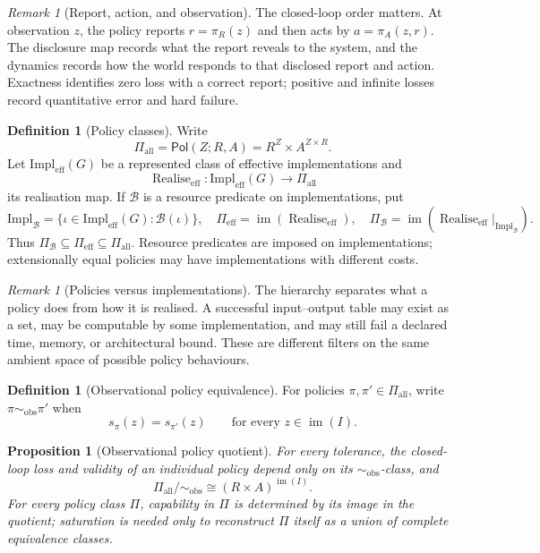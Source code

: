 \documentclass[11pt]{article}
\theoremstyle{plain}
\newtheorem{proposition}[theorem]{Proposition}
\theoremstyle{definition}
\newtheorem{definition}[theorem]{Definition}
\theoremstyle{remark}
\newtheorem{remark}[theorem]{Remark}
\newcommand{\im}{\operatorname{im}}
\newcommand{\Pol}{\mathsf{Pol}}
\newcommand{\realise}{\operatorname{Realise}}
\begin{document}
\begin{remark}[Report, action, and observation]
The closed-loop order matters. At observation $z$, the policy reports
$r=\pi_R(z)$ and then acts by $a=\pi_A(z,r)$. The disclosure map records what the
report reveals to the system, and the dynamics records how the world responds to
that disclosed report and action. Exactness identifies zero loss with a correct
report; positive and infinite losses record quantitative error and hard failure.
\end{remark}

\begin{definition}[Policy classes]\label{def:realise}
Write
\[
\Pi_{\mathrm{all}}=\Pol(Z;R,A)=R^Z\times A^{Z\times R}.
\]
Let $\mathrm{Impl}_{\mathrm{eff}}(G)$ be a represented class of effective
implementations and
\[
\realise_{\mathrm{eff}}:\mathrm{Impl}_{\mathrm{eff}}(G)
\to\Pi_{\mathrm{all}}
\]
its realisation map. If $\mathcal B$ is a resource predicate on implementations,
put
\[
\mathrm{Impl}_{\mathcal B}
=\{\iota\in\mathrm{Impl}_{\mathrm{eff}}(G):\mathcal B(\iota)\},\quad
\Pi_{\mathrm{eff}}=\im(\realise_{\mathrm{eff}}),\quad
\Pi_{\mathcal B}=\im(\realise_{\mathrm{eff}}|_{\mathrm{Impl}_{\mathcal B}}).
\]
Thus $\Pi_{\mathcal B}\subseteq\Pi_{\mathrm{eff}}\subseteq\Pi_{\mathrm{all}}$.
Resource predicates are imposed on implementations; extensionally equal policies
may have implementations with different costs.
\end{definition}

\begin{remark}[Policies versus implementations]
The hierarchy separates what a policy does from how it is realised. A successful
input--output table may exist as a set, may be computable by some implementation,
and may still fail a declared time, memory, or architectural bound. These are
different filters on the same ambient space of possible policy behaviours.
\end{remark}



\begin{definition}[Observational policy equivalence]\label{def:gauge}
For policies $\pi,\pi'\in\Pi_{\mathrm{all}}$, write
$\pi\sim_{\mathrm{obs}}\pi'$ when
\[
s_\pi(z)=s_{\pi'}(z)\qquad\text{for every }z\in\im(I).
\]
\end{definition}

\begin{proposition}[Observational policy quotient]\label{prop:gauge}
For every tolerance, the closed-loop loss and validity of an individual policy
depend only on its $\sim_{\mathrm{obs}}$-class, and
\[
\Pi_{\mathrm{all}}/\!\sim_{\mathrm{obs}}
\cong (R\times A)^{\im(I)}.
\]
For every policy class $\Pi$, capability in $\Pi$ is determined by its image in
the quotient; saturation is needed only to reconstruct $\Pi$ itself as a union
of complete equivalence classes.
\end{proposition}
\end{document}
